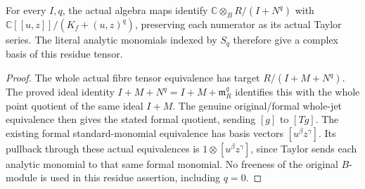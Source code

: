 \begin{theorem}
\label{hir:actual-normal-fibre-standard-basis}
\leanok
For every $I,q$, the actual algebra maps identify
$\mathbb C\otimes_B R/(I+N^q)$ with $\mathbb C[[u,z]]/(K_f+(u,z)^q)$, preserving each numerator as its actual Taylor series.
The literal analytic monomials indexed by $S_q$ therefore give a complex basis of this residue tensor.
\end{theorem}
\begin{proof}
The whole actual fibre tensor equivalence has target $R/(I+M+N^q)$.
The proved ideal identity $I+M+N^q=I+M+\mathfrak m_R^q$ identifies this with the whole point quotient of the same ideal $I+M$.
The genuine original/formal whole-jet equivalence then gives the stated formal quotient, sending $[g]$ to $[Tg]$.
The existing formal standard-monomial equivalence has basis vectors $[u^\beta z^\gamma]$.
Its pullback through these actual equivalences is $1\otimes[u^\beta z^\gamma]$, since Taylor sends each analytic monomial to that same formal monomial.
No freeness of the original $B$-module is used in this residue assertion, including $q=0$.
\end{proof}

